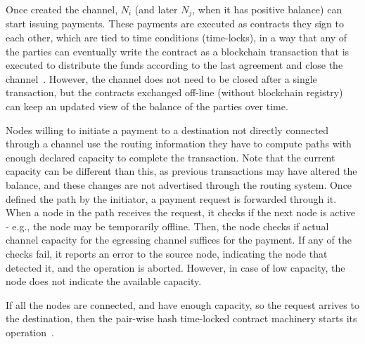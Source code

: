 Once created the channel, $N_i$ (and later $N_j$, when it has positive balance) can start issuing payments. 
These payments are executed as contracts they sign to each other, which are tied to time conditions (time-locks), in a way that any of the parties can eventually write the contract as a blockchain transaction that is executed to distribute the funds according to the last agreement and close the channel~\cite{BOLT_5_transaction_handling}. 
However, the channel does not need to be closed after a single transaction, but the contracts exchanged off-line (without blockchain registry) can keep an updated view of the balance of the parties over time.

Nodes willing to initiate a payment to a destination not directly connected through 
a channel use the routing information they have to compute 
paths with enough declared capacity to complete the transaction. 
Note that the current capacity can be different than this, as previous transactions may have altered the balance, 
and these changes are not advertised through the routing system.
Once defined the path by the initiator, a payment request 
is forwarded through it. 
When a node in the path receives the request, it checks if the next node is active - e.g., the node may be temporarily offline.
Then, the node checks if
actual channel capacity for the egressing channel suffices for the payment. 
If any of the checks fail, it reports an error to the source node, indicating the node that detected it, and the operation is aborted.
However, in case of low capacity, the node does not indicate the available capacity.

If all the nodes are connected, and have enough capacity, so the request arrives to the destination, then
the pair-wise hash time-locked contract machinery starts its operation~\cite{BOLT_2_channel_management, BOLT_5_transaction_handling}.


